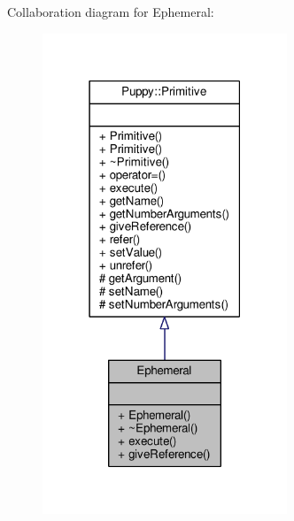 Collaboration diagram for Ephemeral\+:
\nopagebreak
\begin{figure}[H]
\begin{center}
\leavevmode
\includegraphics[width=207pt]{classEphemeral__coll__graph}
\end{center}
\end{figure}
